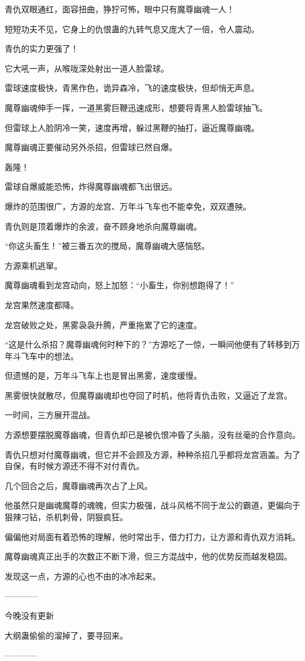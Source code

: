 \begin{this_body}
青仇双眼通红，面容扭曲，狰狞可怖，眼中只有魔尊幽魂一人！

短短功夫不见，它身上的仇恨蛊的九转气息又庞大了一倍，令人震动。

青仇的实力更强了！

它大吼一声，从喉咙深处射出一道人脸雷球。

雷球速度极快，青黑作色，诡异森冷，飞的速度极快，但却悄无声息。

魔尊幽魂伸手一挥，一道黑雾巨鞭迅速成形，想要将青黑人脸雷球抽飞。

但雷球上人脸阴冷一笑，速度再增，躲过黑鞭的抽打，逼近魔尊幽魂。

魔尊幽魂正要催动另外杀招，但雷球已然自爆。

轰隆！

雷球自爆威能恐怖，炸得魔尊幽魂都飞出很远。

爆炸的范围很广，方源的龙宫、万年斗飞车也不能幸免，双双遭殃。

青仇则是顶着爆炸的余波，奋不顾身地杀向魔尊幽魂。

“你这头畜生！”被三番五次的搅局，魔尊幽魂大感恼怒。

方源乘机逃窜。

魔尊幽魂看到龙宫动向，怒上加怒：“小畜生，你别想跑得了！”

龙宫果然速度都降。

龙宫破败之处，黑雾袅袅升腾，严重拖累了它的速度。

“这是什么杀招？魔尊幽魂何时种下的？”方源吃了一惊，一瞬间他便有了转移到万年斗飞车中的想法。

但遗憾的是，万年斗飞车上也是冒出黑雾，速度缓慢。

黑雾很快就散尽，但魔尊幽魂却也夺回了时机，他将青仇击败，又逼近了龙宫。

一时间，三方展开混战。

方源想要摆脱魔尊幽魂，但青仇却已是被仇恨冲昏了头脑，没有丝毫的合作意向。

青仇只想对付魔尊幽魂，但它并不会顾及方源，种种杀招几乎都将龙宫涵盖。为了自保，有时候方源还不得不对付青仇。

几个回合之后，魔尊幽魂再次占了上风。

他虽然只是幽魂魔尊的魂魄，但实力极强，战斗风格不同于龙公的霸道，更偏向于狠辣刁钻，杀机刺骨，阴狠疯狂。

偏偏他对局面有着恐怖的理解，他时常出手，借力打力，让方源和青仇双方消耗。

魔尊幽魂真正出手的次数正不断下滑，但三方混战中，他的优势反而越发稳固。

发现这一点，方源的心也不由的冰冷起来。

------------

今晚没有更新

大纲蛊偷偷的溜掉了，要寻回来。

------------

\end{this_body}

